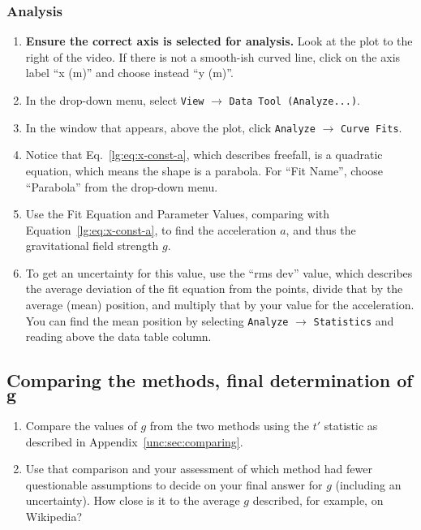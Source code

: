 \subsubsection{Analysis}

\begin{enumerate}
	\item \textbf{Ensure the correct axis is selected for analysis.} Look at the plot to the right of the video. If there is not a smooth-ish curved line, click on the axis label ``x (m)'' and choose instead ``y (m)''.
	
	\item In the drop-down menu, select \texttt{View} $\rightarrow$ \texttt{Data Tool (Analyze...)}.
	
	\item In the window that appears, above the plot, click \texttt{Analyze} $\rightarrow$ \texttt{Curve Fits}.
	
	\item Notice that Eq.~\ref{lg:eq:x-const-a}, which describes freefall, is a quadratic equation, which means the shape is a parabola. For ``Fit Name'', choose ``Parabola'' from the drop-down menu.
	
	\item Use the Fit Equation and Parameter Values, comparing with Equation~\ref{lg:eq:x-const-a}, to find the acceleration $a$, and thus the gravitational field strength $g$.
	
	\item To get an uncertainty for this value, use the ``rms dev'' value, which describes the average deviation of the fit equation from the points, divide that by the average (mean) position, and multiply that by your value for the acceleration. You can find the mean position by selecting \texttt{Analyze} $\rightarrow$ \texttt{Statistics} and reading above the data table column.
\end{enumerate}

\subsection{Comparing the methods, final determination of $\bm{g}$}

\begin{enumerate}
	\item Compare the values of $g$ from the two methods using the $t'$ statistic as described in Appendix~\ref{unc:sec:comparing}.
	
	\item Use that comparison and your assessment of which method had fewer questionable assumptions to decide on your final answer for $g$ (including an uncertainty). How close is it to the average $g$ described, for example, on Wikipedia?
\end{enumerate}